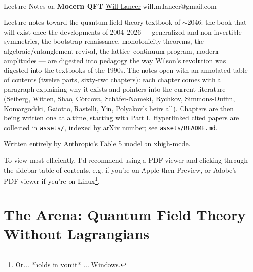 \documentclass[11pt]{article}
\numberwithin{equation}{section}
\renewcommand{\theHsection}{part.\arabic{part}.section.\arabic{section}}
\renewcommand{\theHequation}{\theHsection.equation.\arabic{equation}}
\theoremstyle{definition}
\begin{document}
\thispagestyle{empty}
\bigskip \
\vspace{0.1cm}

\begin{center}
{\fontsize{22}{22} \selectfont Lecture Notes on}
\vskip 16pt
{\fontsize{36}{36} \selectfont \bf \sffamily Modern QFT}
\vskip 24pt
{\fontsize{18}{18} \selectfont \rmfamily \href{https://will-lancer.github.io}{Will Lancer}}
\vskip 6pt
{\fontsize{14}{14} \selectfont \ttfamily will.m.lancer@gmail.com}
\vskip 24pt
\end{center}

{\parindent0pt \baselineskip=15.5pt}
\noin
Lecture notes toward the quantum field theory textbook of $\sim$2046: the book 
that will exist once the developments of 2004--2026 --- generalized and 
non-invertible symmetries, the bootstrap renaissance, monotonicity theorems, the
algebraic/entanglement revival, the lattice--continuum program, modern
amplitudes --- are digested
into pedagogy the way Wilson's revolution was digested into the textbooks of the 
1990s. The notes open with an annotated table of contents (twelve parts,
sixty-two chapters): each chapter comes with a paragraph explaining why it
exists and pointers into the current literature (Seiberg, Witten, Shao, 
C\'ordova, Sch\"afer-Nameki, Rychkov, Simmons-Duffin, Komargodski, Gaiotto, 
Rastelli, Yin, Polyakov's heirs all). Chapters are then being written one at a
time, starting with Part I. Hyperlinked cited papers are collected in
\texttt{assets/}, indexed by arXiv number; see \texttt{assets/README.md}.\\

\begin{center}
    Written entirely by Anthropic's Fable 5 model on xhigh-mode.
\end{center}

To view most efficiently, I'd recommend using a PDF viewer and clicking
through the sidebar table of contents, e.g. if you're on Apple then
Preview, or Adobe's PDF viewer if you're on Linux\footnote{Or$\ldots$ *holds in vomit* $\ldots$ Windows.}.
\newpage
\microtoc
\newpage



\newpage

\part{The Arena: Quantum Field Theory Without Lagrangians}


\newpage

\newpage


\clearpage
\appendix
\renewcommand{\theHsection}{appendix.section.\arabic{section}}
\renewcommand{\theHequation}{\theHsection.equation.\arabic{equation}}

\end{document}
